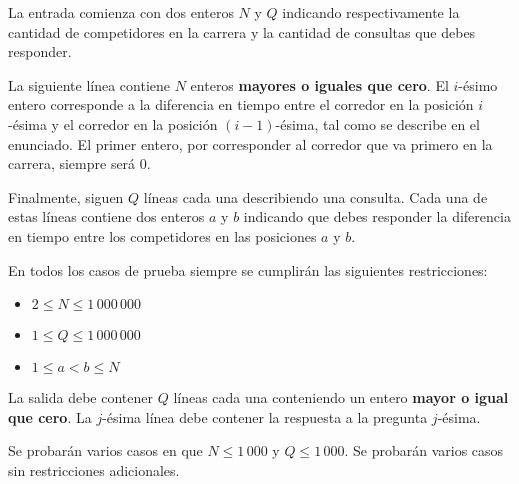 \documentclass{oci}
\begin{document}
\begin{inputDescription}
  La entrada comienza con dos enteros $N$ y $Q$ indicando respectivamente la cantidad de
  competidores en la carrera y la cantidad de consultas que debes responder.

  La siguiente línea contiene $N$ enteros \textbf{mayores o iguales que cero}.
  El $i$-ésimo entero corresponde a la diferencia en tiempo entre el corredor en la posición
  $i$-ésima y el corredor en la posición $(i-1)$-ésima, tal como se describe en el enunciado.
  El primer entero, por corresponder al corredor que va primero en la carrera, siempre será 0.
  
  Finalmente, siguen $Q$ líneas cada una describiendo una consulta.
  Cada una de estas líneas contiene dos enteros $a$ y $b$ indicando que debes
  responder la diferencia en tiempo entre los competidores en las posiciones $a$ y $b$.

  En todos los casos de prueba siempre se cumplirán las siguientes restricciones:
  \begin{itemize}
  \item $2 \leq N \leq 1\,000\,000$
  \item $1 \leq Q \leq 1\,000\,000$
  \item $1 \leq a < b \leq N$
  \end{itemize}
\end{inputDescription}

\begin{outputDescription}
  La salida debe contener $Q$ líneas cada una conteniendo un entero \textbf{mayor o igual que cero}.
  La $j$-ésima línea debe contener la respuesta a la pregunta $j$-ésima.
\end{outputDescription}

\begin{scoreDescription}
  Se probarán varios casos en que $N \leq 1\,000$ y $Q \leq 1\,000$.
  Se probarán varios casos sin restricciones adicionales.
\end{scoreDescription}

\begin{sampleDescription}
\end{sampleDescription}
\end{document}
